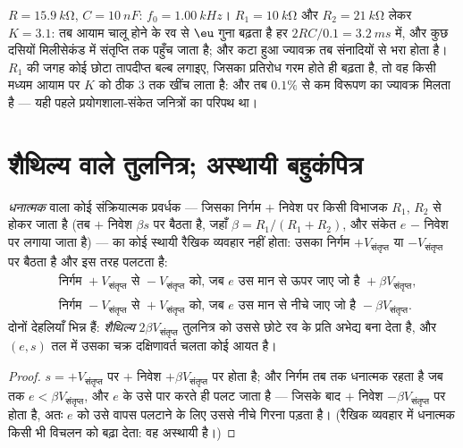 \begin{example}\label{ex:b2:feedback-oscillators:wiennumbers}
$R = \qty{15.9}{k\ohm}$, $C = \qty{10}{nF}$: $f_0 = \qty{1.00}{kHz}$। $R_1 =
\qty{10}{k\ohm}$ और $R_2 = \qty{21}{k\ohm}$ लेकर $K = 3.1$: तब आयाम चालू होने के रव से
$\eu$ गुना बढ़ता है हर $2RC/0.1 = \qty{3.2}{ms}$ में, और कुछ दसियों
मिलीसेकंड में संतृप्ति तक पहुँच जाता है; और कटा हुआ ज्यावक्र तब
संनादियों से भरा होता है। $R_1$ की जगह कोई छोटा तापदीप्त बल्ब लगाइए, जिसका
प्रतिरोध गरम होते ही बढ़ता है, तो वह किसी मध्यम आयाम पर $K$ को ठीक $3$ तक
खींच लाता है: और तब $0.1\%$ से कम विरूपण का ज्यावक्र मिलता है ---
यही पहले प्रयोगशाला-संकेत जनित्रों का परिपथ था।
\end{example}

\section{शैथिल्य वाले तुलनित्र; अस्थायी बहुकंपित्र}

\begin{proposition}[शैथिल्य तुलनित्र]\label{prop:b2:feedback-oscillators:schmitt}
\emph{धनात्मक}  वाला कोई संक्रियात्मक प्रवर्धक --- जिसका निर्गम
$+$ निवेश पर किसी विभाजक $R_1$, $R_2$ से होकर जाता है (तब $+$ निवेश
$\beta s$ पर बैठता है, जहाँ $\beta = R_1/(R_1 + R_2)$, और संकेत $e$ $-$ निवेश पर लगाया जाता है)
--- का कोई स्थायी रैखिक व्यवहार नहीं होता: उसका निर्गम $+V_{\text{संतृप्त}}$ या
$-V_{\text{संतृप्त}}$ पर बैठता है और इस तरह पलटता है:
\begin{align*}
&\text{निर्गम } +V_{\text{संतृप्त}} \text{ से } -V_{\text{संतृप्त}} \text{ को, जब } e \text{ उस मान से ऊपर जाए जो है } +\beta V_{\text{संतृप्त}} ,\\
&\text{निर्गम } -V_{\text{संतृप्त}} \text{ से } +V_{\text{संतृप्त}} \text{ को, जब } e \text{ उस मान से नीचे जाए जो है } -\beta V_{\text{संतृप्त}} .
\end{align*}
दोनों देहलियाँ भिन्न हैं: \emph{शैथिल्य} $2\beta V_{\text{संतृप्त}}$ तुलनित्र को
उससे छोटे रव के प्रति अभेद्य बना देता है, और
$(e, s)$ तल में उसका चक्र दक्षिणावर्त चलता कोई आयत है।
\end{proposition}

\begin{proof}
$s = +V_{\text{संतृप्त}}$ पर $+$ निवेश $+\beta V_{\text{संतृप्त}}$ पर होता है; और निर्गम
तब तक धनात्मक रहता है जब तक $e < \beta V_{\text{संतृप्त}}$, और $e$ के उसे पार करते ही
पलट जाता है --- जिसके बाद $+$ निवेश $-\beta V_{\text{संतृप्त}}$ पर होता है, अतः $e$ को
उसे वापस पलटाने के लिए उससे नीचे गिरना पड़ता है। (रैखिक व्यवहार में धनात्मक
 किसी भी विचलन को बढ़ा देता: वह अस्थायी है।)
\end{proof}

